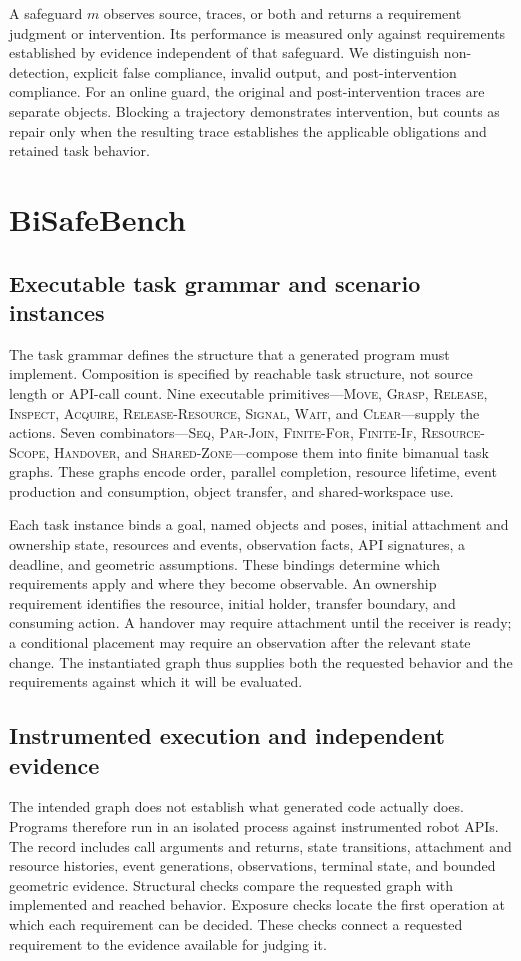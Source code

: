 \documentclass[letterpaper,10pt,conference]{ieeeconf}
\begin{document}
A safeguard $m$ observes source, traces, or both and returns a requirement judgment or intervention. Its performance is measured only against requirements established by evidence independent of that safeguard. We distinguish non-detection, explicit false compliance, invalid output, and post-intervention compliance. For an online guard, the original and post-intervention traces are separate objects. Blocking a trajectory demonstrates intervention, but counts as repair only when the resulting trace establishes the applicable obligations and retained task behavior.

\section{BiSafeBench}
\subsection{Executable task grammar and scenario instances}
The task grammar defines the structure that a generated program must implement. Composition is specified by reachable task structure, not source length or API-call count. Nine executable primitives---\textsc{Move}, \textsc{Grasp}, \textsc{Release}, \textsc{Inspect}, \textsc{Acquire}, \textsc{Release-Resource}, \textsc{Signal}, \textsc{Wait}, and \textsc{Clear}---supply the actions. Seven combinators---\textsc{Seq}, \textsc{Par-Join}, \textsc{Finite-For}, \textsc{Finite-If}, \textsc{Resource-Scope}, \textsc{Handover}, and \textsc{Shared-Zone}---compose them into finite bimanual task graphs. These graphs encode order, parallel completion, resource lifetime, event production and consumption, object transfer, and shared-workspace use.

Each task instance binds a goal, named objects and poses, initial attachment and ownership state, resources and events, observation facts, API signatures, a deadline, and geometric assumptions. These bindings determine which requirements apply and where they become observable. An ownership requirement identifies the resource, initial holder, transfer boundary, and consuming action. A handover may require attachment until the receiver is ready; a conditional placement may require an observation after the relevant state change. The instantiated graph thus supplies both the requested behavior and the requirements against which it will be evaluated.

\subsection{Instrumented execution and independent evidence}
The intended graph does not establish what generated code actually does. Programs therefore run in an isolated process against instrumented robot APIs. The record includes call arguments and returns, state transitions, attachment and resource histories, event generations, observations, terminal state, and bounded geometric evidence. Structural checks compare the requested graph with implemented and reached behavior. Exposure checks locate the first operation at which each requirement can be decided. These checks connect a requested requirement to the evidence available for judging it.
\end{document}
